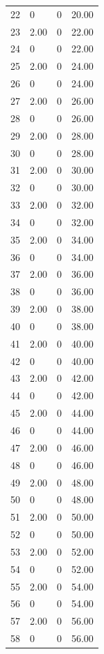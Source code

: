 \documentclass[a4paper,11pt]{article}
\begin{document}
\begin{center}
\begin{longtable}{|R{1.5cm}|R{2.4cm}|R{2.4cm}|R{2.4cm}|}
   22 & 0  & 0  &  20.00 \\ 
   23 &   2.00  & 0  &  22.00 \\ 
   24 & 0  & 0  &  22.00 \\ 
   25 &   2.00  & 0  &  24.00 \\ 
   26 & 0  & 0  &  24.00 \\ 
   27 &   2.00  & 0  &  26.00 \\ 
   28 & 0  & 0  &  26.00 \\ 
   29 &   2.00  & 0  &  28.00 \\ 
   30 & 0  & 0  &  28.00 \\ 
   31 &   2.00  & 0  &  30.00 \\ 
   32 & 0  & 0  &  30.00 \\ 
   33 &   2.00  & 0  &  32.00 \\ 
   34 & 0  & 0  &  32.00 \\ 
   35 &   2.00  & 0  &  34.00 \\ 
   36 & 0  & 0  &  34.00 \\ 
   37 &   2.00  & 0  &  36.00 \\ 
   38 & 0  & 0  &  36.00 \\ 
   39 &   2.00  & 0  &  38.00 \\ 
   40 & 0  & 0  &  38.00 \\ 
   41 &   2.00  & 0  &  40.00 \\ 
   42 & 0  & 0  &  40.00 \\ 
   43 &   2.00  & 0  &  42.00 \\ 
   44 & 0  & 0  &  42.00 \\ 
   45 &   2.00  & 0  &  44.00 \\ 
   46 & 0  & 0  &  44.00 \\ 
   47 &   2.00  & 0  &  46.00 \\ 
   48 & 0  & 0  &  46.00 \\ 
   49 &   2.00  & 0  &  48.00 \\ 
   50 & 0  & 0  &  48.00 \\ 
   51 &   2.00  & 0  &  50.00 \\ 
   52 & 0  & 0  &  50.00 \\ 
   53 &   2.00  & 0  &  52.00 \\ 
   54 & 0  & 0  &  52.00 \\ 
   55 &   2.00  & 0  &  54.00 \\ 
   56 & 0  & 0  &  54.00 \\ 
   57 &   2.00  & 0  &  56.00 \\ 
   58 & 0  & 0  &  56.00 \\ 

\end{longtable}
\end{center}
\end{document}
